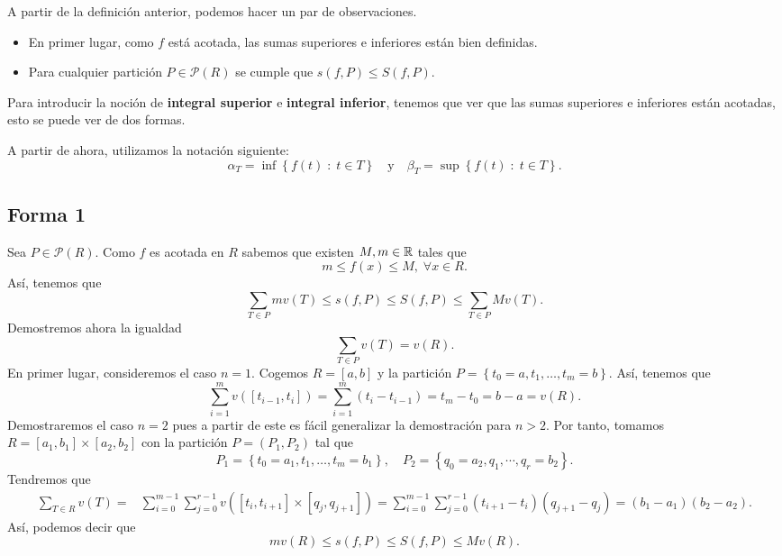 \begin{observation}
A partir de la definición anterior, podemos hacer un par de observaciones. 
\begin{itemize}
\item En primer lugar, como $\displaystyle f $ está acotada, las sumas superiores e inferiores están bien definidas.
\item Para cualquier partición $\displaystyle P \in \mathcal{P}\left(R\right) $ se cumple que $\displaystyle s\left(f,P\right)\leq S\left(f,P\right) $.
\end{itemize}
\end{observation}
Para introducir la noción de \textbf{integral superior} e \textbf{integral inferior}, tenemos que ver que las sumas superiores e inferiores están acotadas, esto se puede ver de dos formas.
\begin{notation}
A partir de ahora, utilizamos la notación siguiente:
\[\alpha_{T} = \inf \left\{ f\left(t\right) \; : \; t \in T\right\} \quad \text{y} \quad \beta_{T} = \sup \left\{ f\left(t\right) \; : \; t \in T\right\}  .\]
\end{notation}

\subsection*{Forma 1}
Sea $\displaystyle P \in \mathcal{P}\left(R\right) $. Como $\displaystyle f $ es acotada en $\displaystyle R $ sabemos que existen $\displaystyle M,m \in \mathbb{R} $ tales que 
\[m \leq f\left(x\right)\leq M, \; \forall x \in R .\]
Así, tenemos que 
\[\sum_{T\in P}mv\left(T\right) \leq s\left(f,P\right) \leq S\left(f,P\right)\leq \sum_{T \in P}Mv\left(T\right) .\]
Demostremos ahora la igualdad
\[\sum_{T \in P} v\left(T\right) = v\left(R\right).\]
En primer lugar, consideremos el caso $\displaystyle n = 1 $. Cogemos $\displaystyle R = [a,b] $ y la partición $\displaystyle P = \left\{ t_{0} = a, t_{1}, \ldots, t_{m} = b\right\}  $. Así, tenemos que 
\[\sum^{m}_{i = 1}v\left(\left[t_{i-1}, t_{i}\right] \right) = \sum^{m}_{i = 1}\left(t_{i}-t_{i-1}\right) = t_{m}-t_{0} = b-a = v\left(R\right).\]
Demostraremos el caso $\displaystyle n = 2 $ pues a partir de este es fácil generalizar la demostración para $\displaystyle n > 2 $. Por tanto, tomamos $\displaystyle R = [a_{1}, b_{1}]\times[a_{2}, b_{2}] $ con la partición $\displaystyle P = \left(P_{1}, P_{2}\right) $ tal que 
\[P_{1} = \left\{ t_{0} = a_{1} , t_{1}, \ldots, t_{m} = b_{1}\right\} , \quad P_{2} = \left\{ q_{0} = a_{2} , q_{1} , \cdots , q_{r} = b_{2}\right\}  .\]
Tendremos que 
\[
\begin{split}
	\sum_{T \in R}v\left(T\right) = & \sum^{m - 1}_{i = 0}\sum^{r - 1}_{j = 0}v\left(\left[t_{i}, t_{i+1}\right] \times \left[q_{j}, q_{j+1}\right] \right) = \sum^{m - 1}_{i = 0}\sum^{r - 1}_{j = 0} \left(t_{i+1}-t_{i}\right)\left(q_{j+1}-q_{j}\right) = \left(b_{1}-a_{1}\right) \left(b_{2}-a_{2}\right).
\end{split}
\]
Así, podemos decir que
\[mv\left(R\right)\leq s\left(f,P\right) \leq S\left(f,P\right) \leq Mv\left(R\right) .\]
